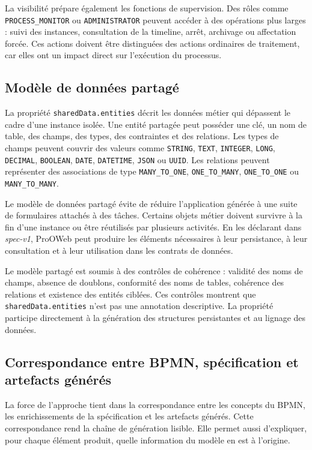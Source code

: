 La visibilité prépare également les fonctions de supervision. Des rôles comme \texttt{PROCESS\_MONITOR} ou \texttt{ADMINISTRATOR} peuvent accéder à des opérations plus larges : suivi des instances, consultation de la timeline, arrêt, archivage ou affectation forcée. Ces actions doivent être distinguées des actions ordinaires de traitement, car elles ont un impact direct sur l'exécution du processus.

\subsection{Modèle de données partagé}

La propriété \texttt{sharedData.entities} décrit les données métier qui dépassent le cadre d'une instance isolée. Une entité partagée peut posséder une clé, un nom de table, des champs, des types, des contraintes et des relations. Les types de champs peuvent couvrir des valeurs comme \texttt{STRING}, \texttt{TEXT}, \texttt{INTEGER}, \texttt{LONG}, \texttt{DECIMAL}, \texttt{BOOLEAN}, \texttt{DATE}, \texttt{DATETIME}, \texttt{JSON} ou \texttt{UUID}. Les relations peuvent représenter des associations de type \texttt{MANY\_TO\_ONE}, \texttt{ONE\_TO\_MANY}, \texttt{ONE\_TO\_ONE} ou \texttt{MANY\_TO\_MANY}.

Le modèle de données partagé évite de réduire l'application générée à une suite de formulaires attachés à des tâches. Certains objets métier doivent survivre à la fin d'une instance ou être réutilisés par plusieurs activités. En les déclarant dans \textit{spec-v1}, ProOWeb peut produire les éléments nécessaires à leur persistance, à leur consultation et à leur utilisation dans les contrats de données.

Le modèle partagé est soumis à des contrôles de cohérence : validité des noms de champs, absence de doublons, conformité des noms de tables, cohérence des relations et existence des entités ciblées. Ces contrôles montrent que \texttt{sharedData.entities} n'est pas une annotation descriptive. La propriété participe directement à la génération des structures persistantes et au lignage des données.

\subsection{Correspondance entre BPMN, spécification et artefacts générés}

La force de l'approche tient dans la correspondance entre les concepts du BPMN, les enrichissements de la spécification et les artefacts générés. Cette correspondance rend la chaîne de génération lisible. Elle permet aussi d'expliquer, pour chaque élément produit, quelle information du modèle en est à l'origine.

